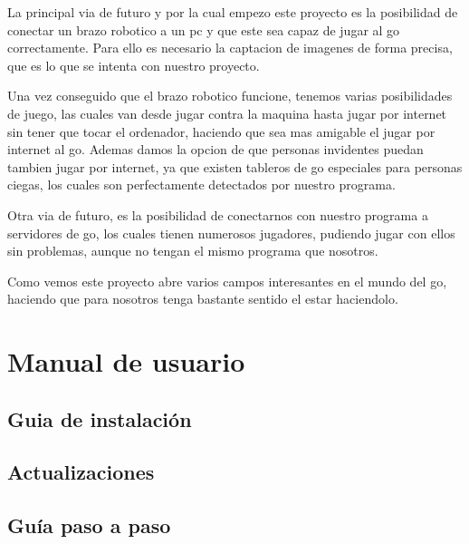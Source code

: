 \documentclass[12pt,a4paper]{report}
\begin{document}
La principal via de futuro y por la cual empezo este proyecto es la posibilidad de conectar un brazo robotico a un pc y que este sea capaz de jugar al go correctamente. Para ello es necesario la captacion de imagenes de forma precisa, que es lo que se intenta con nuestro proyecto. 

Una vez conseguido que el brazo robotico funcione, tenemos varias posibilidades de juego, las cuales van desde jugar contra la maquina hasta jugar por internet sin tener que tocar el ordenador, haciendo que sea mas amigable el jugar por internet al go. Ademas damos la opcion de que personas invidentes puedan tambien jugar por internet, ya que existen tableros de go especiales para personas ciegas, los cuales son perfectamente detectados por nuestro programa.

Otra via de futuro, es la posibilidad de conectarnos con nuestro programa a servidores de go, los cuales tienen numerosos jugadores, pudiendo jugar con ellos sin problemas, aunque no tengan el mismo programa que nosotros.

Como vemos este proyecto abre varios campos interesantes en el mundo del go, haciendo que para nosotros tenga bastante sentido el estar haciendolo. 

\chapter{Manual de usuario}
\section{Guia de instalación}
\section{Actualizaciones}
\section{Guía paso a paso}
\end{document}
